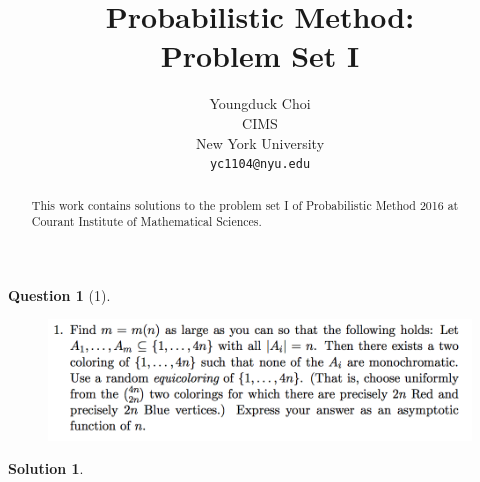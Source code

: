\documentclass{article} %
\title{Probabilistic Method: \\
Problem Set I}
\author{
Youngduck Choi \\
CIMS \\
New York University\\
\texttt{yc1104@nyu.edu} \\
}
\theoremstyle{quest}
\newtheorem*{question}{Question}
\newtheorem*{solution}{Solution}
\begin{document}
\maketitle

\begin{abstract}
This work contains solutions to the problem set I
of Probabilistic Method 2016 at Courant Institute of Mathematical Sciences.
\end{abstract}

\bigskip

\begin{question}[1]
\hfill
\begin{figure}[h!]
  \centering
    \includegraphics[width=1\textwidth]{pm-1-1.png}
\end{figure}
\end{question}
\begin{solution}
\end{solution}

\pagebreak
\end{document}
